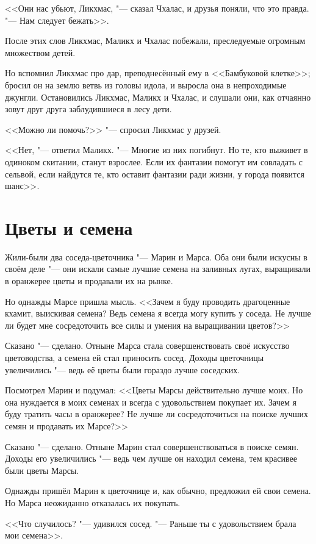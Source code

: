 \documentclass[a4paper,10pt]{book}
\begin{document}
<<Они нас убьют, Ликхмас, "--- сказал Чхалас, и друзья поняли, что это правда. "--- Нам следует бежать>>.

После этих слов Ликхмас, Маликх и Чхалас побежали, преследуемые огромным множеством детей.

Но вспомнил Ликхмас про дар, преподнесённый ему в <<Бамбуковой клетке>>; бросил он на землю ветвь из головы идола, и выросла она в непроходимые джунгли. Остановились Ликхмас, Маликх и Чхалас, и слушали они, как отчаянно зовут друг друга заблудившиеся в лесу дети.

<<Можно ли помочь?>> "--- спросил Ликхмас у друзей.

<<Нет, "--- ответил Маликх. "--- Многие из них погибнут. Но те, кто выживет в одиноком скитании, станут взрослее. Если их фантазии помогут им совладать с сельвой, если найдутся те, кто оставит фантазии ради жизни, у города появится шанс>>.

\section{Цветы и семена}

Жили-были два соседа-цветочника "--- Марин и Марса. Оба они были искусны в 
своём 
деле "--- они искали самые лучшие семена на заливных лугах, выращивали в 
оранжерее цветы и продавали их на рынке.

Но однажды Марсе пришла мысль. <<Зачем я буду проводить драгоценные кхамит, 
выискивая семена? Ведь семена я всегда могу купить у соседа. Не лучше ли будет 
мне сосредоточить все силы и умения на выращивании цветов?>>

Сказано "--- сделано. Отныне Марса стала совершенствовать своё искусство 
цветоводства, а семена ей стал приносить сосед. Доходы цветочницы увеличились 
"--- ведь её цветы были гораздо лучше соседских.

Посмотрел Марин и подумал: <<Цветы Марсы действительно лучше моих. Но она 
нуждается в моих семенах и всегда с удовольствием покупает их. Зачем я буду 
тратить часы в оранжерее? Не лучше ли сосредоточиться на поиске лучших семян и 
продавать их Марсе?>>

Сказано "--- сделано. Отныне Марин стал совершенствоваться в поиске семян. 
Доходы его увеличились "--- ведь чем лучше он находил семена, тем красивее были 
цветы Марсы.

Однажды пришёл Марин к цветочнице и, как обычно, предложил ей свои семена. Но 
Марса неожиданно отказалась их покупать.

<<Что случилось? "--- удивился сосед. "--- Раньше ты с удовольствием брала мои 
семена>>.
\end{document}
